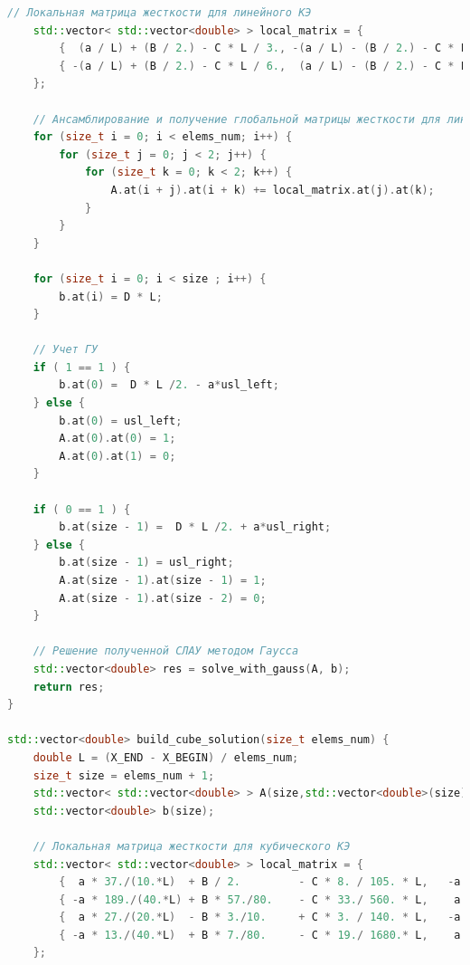 \begin{lstlisting}[language=c++, label=prog,caption={\textit{Реализация МКЭ}}]
    // Локальная матрица жесткости для линейного КЭ
    std::vector< std::vector<double> > local_matrix = {
        {  (a / L) + (B / 2.) - C * L / 3., -(a / L) - (B / 2.) - C * L / 6.},
        { -(a / L) + (B / 2.) - C * L / 6.,  (a / L) - (B / 2.) - C * L / 3.},
    };

    // Ансамблирование и получение глобальной матрицы жесткости для линейного КЭ
    for (size_t i = 0; i < elems_num; i++) {
        for (size_t j = 0; j < 2; j++) {
            for (size_t k = 0; k < 2; k++) {
                A.at(i + j).at(i + k) += local_matrix.at(j).at(k);
            }
        }
    }

    for (size_t i = 0; i < size ; i++) {
        b.at(i) = D * L;
    }

    // Учет ГУ
    if ( 1 == 1 ) {
        b.at(0) =  D * L /2. - a*usl_left;
    } else {
        b.at(0) = usl_left;
        A.at(0).at(0) = 1;
        A.at(0).at(1) = 0;
    }

    if ( 0 == 1 ) {
        b.at(size - 1) =  D * L /2. + a*usl_right;
    } else {
        b.at(size - 1) = usl_right;
        A.at(size - 1).at(size - 1) = 1;
        A.at(size - 1).at(size - 2) = 0;
    }

    // Решение полученной СЛАУ методом Гаусса
    std::vector<double> res = solve_with_gauss(A, b);
    return res;
}

std::vector<double> build_cube_solution(size_t elems_num) {
    double L = (X_END - X_BEGIN) / elems_num;
    size_t size = elems_num + 1;
    std::vector< std::vector<double> > A(size,std::vector<double>(size));
    std::vector<double> b(size);
    
    // Локальная матрица жесткости для кубического КЭ
    std::vector< std::vector<double> > local_matrix = {
        {  a * 37./(10.*L)  + B / 2.         - C * 8. / 105. * L,   -a * 189./(40.*L) - B * 57./80.  - C * 33. / 560. * L,   a * 27./(20.*L)   + B * 3./10.   + C * 3.  / 140. * L,   -a * 13./(40.*L)   - B * 7./80.   - C * 19.  / 1680. * L},
        { -a * 189./(40.*L) + B * 57./80.    - C * 33./ 560. * L,    a * 54./(5.*L)   + 0.           - C * 27. /  70. * L,  -a * 297./(40.*L)  - B * 81./80.  + C * 27. / 560. * L,    a * 27./(20.*L)   + B * 3./10.   + C * 3.   /  140. * L},
        {  a * 27./(20.*L)  - B * 3./10.     + C * 3. / 140. * L,   -a * 297./(40.*L) + B * 81./80.  + C * 27. / 560. * L,   a * 54./(5.*L)    - 0.           - C * 27. / 70.  * L,   -a * 189./(40.*L)  - B * 57./80.  - C * 33.  /  560. * L},
        { -a * 13./(40.*L)  + B * 7./80.     - C * 19./ 1680.* L,    a * 27./(20.*L)  - B * 3./10.   + C * 3.  / 140. * L,  -a * 189./(40.*L)  + B * 57./80.  - C * 33. / 560. * L,    a * 37./(10.*L)   - B * 1./2.    - C * 8.   /  105. * L}
    };
    

\end{lstlisting}
